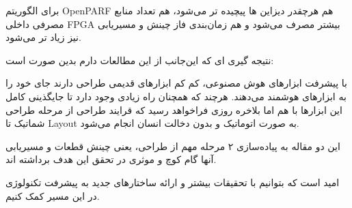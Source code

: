 برای الگوریتم OpenPARF هم هرچقدر دیزاین ها پیچیده تر می‌شود، هم تعداد منابع مصرفی داخلی FPGA بیشتر مصرف می‌شود و هم زمان‌بندی فاز چینش و مسیریابی نیز زیاد تر می‌شود.


نتیجه گیری ای که این‌جانب از این مطالعات دارم بدین صورت است:

با پیشرفت ابزار‌های هوش مصنوعی، کم کم ابزار‌های قدیمی طراحی دارند جای خود را به ابزار‌های هوشمند می‌دهند. هرچند که همچنان راه زیادی وجود دارد تا جایگذینی کامل این ابزار‌ها با هم اما بلاخره روزی فرا‌خواهد رسید که قرایند طراحی از مرحله طراحی شماتیک تا Layout به صورت اتوماتیک و بدون دخالت انسان انجام می‌شود.

این دو مقاله به پیاده‌سازی ۲ مرحله مهم از طراحی، یعنی چینش قطعات و مسیر‌یابی آنها گام کوچ و موثری در تحقق این هدف برداشته اند.

امید است که بتوانیم با تحقیقات بیشتر و ارائه ساختار‌های جدید به پیشرفت تکنولوژی در این مسیر کمک کنیم.